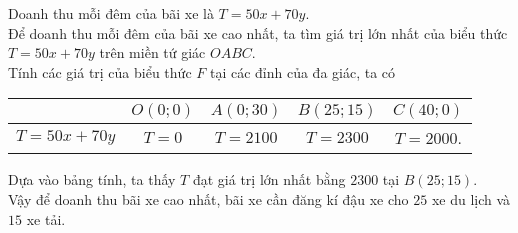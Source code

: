 \begin{bt}
{{\begin{tikzpicture}[scale=1, font=\footnotesize, line join=round, line cap=round, >=stealth]
\end{tikzpicture}
}
	\noindent Doanh thu mỗi đêm của bãi xe là $T=50x+70y$.\\
	Để doanh thu mỗi đêm của bãi xe cao nhất, ta tìm giá trị lớn nhất của biểu thức $T=50x+70y$ trên miền tứ giác $OABC$.\\
	Tính các giá trị của biểu thức $F$ tại các đỉnh của đa giác, ta có
	\begin{center}
		\begin{longtable}{|c|c|c|c|c|}
			\hline
			& $O(0;0)$& $A(0;30)$& $B(25;15)$& $C(40;0)$\\
			\hline
			$T=50x+70y$& $T=0$ & $T=2100$ &$T=2300$ & $T=2000$.\\
			\hline
		\end{longtable}
	\end{center}
	Dựa vào bảng tính, ta thấy $T$ đạt giá trị lớn nhất bằng $2300$ tại $B(25;15)$.\\
	Vậy để doanh thu bãi xe cao nhất, bãi xe cần đăng kí đậu xe cho $25$ xe du lịch và $15$ xe tải.
	
}
\end{bt}



